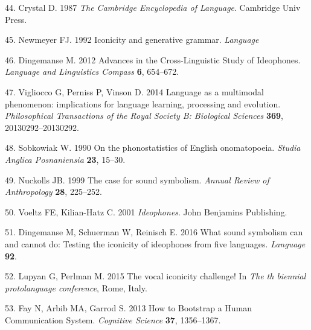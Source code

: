 \documentclass[english,floatsintext,man]{apa6}
\theoremstyle{definition}
\theoremstyle{definition}
\theoremstyle{definition}
\theoremstyle{remark}
\begin{document}
\leavevmode\hypertarget{ref-Crystal:1987en}{}%
44. Crystal D. 1987 \emph{The Cambridge Encyclopedia of Language}.
Cambridge Univ Press.

\leavevmode\hypertarget{ref-Newmeyer:1992we}{}%
45. Newmeyer FJ. 1992 Iconicity and generative grammar. \emph{Language}

\leavevmode\hypertarget{ref-Dingemanse:2012fc}{}%
46. Dingemanse M. 2012 Advances in the Cross-Linguistic Study of
Ideophones. \emph{Language and Linguistics Compass} \textbf{6},
654--672.

\leavevmode\hypertarget{ref-Vigliocco:2014fc}{}%
47. Vigliocco G, Perniss P, Vinson D. 2014 Language as a multimodal
phenomenon: implications for language learning, processing and
evolution. \emph{Philosophical Transactions of the Royal Society B:
Biological Sciences} \textbf{369}, 20130292--20130292.

\leavevmode\hypertarget{ref-Sobkowiak:1990ph}{}%
48. Sobkowiak W. 1990 On the phonostatistics of English onomatopoeia.
\emph{Studia Anglica Posnaniensia} \textbf{23}, 15--30.

\leavevmode\hypertarget{ref-Nuckolls:1999ca}{}%
49. Nuckolls JB. 1999 The case for sound symbolism. \emph{Annual Review
of Anthropology} \textbf{28}, 225--252.

\leavevmode\hypertarget{ref-Voeltz:2001vv}{}%
50. Voeltz FE, Kilian-Hatz C. 2001 \emph{Ideophones}. John Benjamins
Publishing.

\leavevmode\hypertarget{ref-Dingemanse:2016vd}{}%
51. Dingemanse M, Schuerman W, Reinisch E. 2016 What sound symbolism can
and cannot do: Testing the iconicity of ideophones from five languages.
\emph{Language} \textbf{92}.

\leavevmode\hypertarget{ref-Lupyan:2015vic}{}%
52. Lupyan G, Perlman M. 2015 The vocal iconicity challenge! In
\emph{The th biennial protolanguage conference}, Rome, Italy.

\leavevmode\hypertarget{ref-Fay:2013jpa}{}%
53. Fay N, Arbib MA, Garrod S. 2013 How to Bootstrap a Human
Communication System. \emph{Cognitive Science} \textbf{37}, 1356--1367.


\clearpage
\renewcommand{\listtablename}{Table captions}
\listoftables

\clearpage
\renewcommand{\listfigurename}{Figure captions}
\listoffigures
\end{document}
